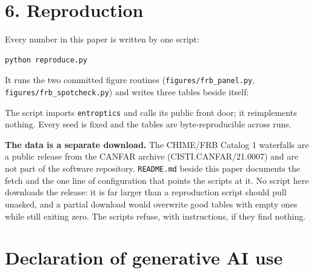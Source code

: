 \documentclass[10pt,letterpaper,twocolumn]{article}
\begin{document}
\section{6. Reproduction}\label{6-reproduction}

Every number in this paper is written by one script:

\begin{verbatim}
python reproduce.py
\end{verbatim}

It runs the two committed figure routines (\texttt{figures/\allowbreak{}frb\_\allowbreak{}panel.\allowbreak{}py}, \texttt{figures/\allowbreak{}frb\_\allowbreak{}spotcheck.\allowbreak{}py}) and writes three tables beside itself:


The script imports \texttt{entroptics} and calls its public front door; it reimplements nothing. Every seed is fixed and the tables are byte-reproducible across runs.

\textbf{The data is a separate download.} The CHIME/FRB Catalog 1 waterfalls are a public release from the CANFAR archive (CISTI.CANFAR/21.0007) and are not part of the software repository. \texttt{README.\allowbreak{}md} beside this paper documents the fetch and the one line of configuration that points the scripts at it. No script here downloads the release: it is far larger than a reproduction script should pull unasked, and a partial download would overwrite good tables with empty ones while still exiting zero. The scripts refuse, with instructions, if they find nothing.

\section{Declaration of generative AI use}\label{declaration-of-generative-ai-use}
\end{document}
